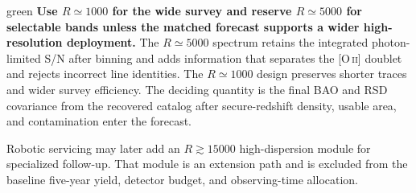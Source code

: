 \begin{leadbox}[title=Cosmology Selection Rule]{green}
\textbf{Use $R\simeq1000$ for the wide survey and reserve $R\simeq5000$ for selectable bands unless the matched forecast supports a wider high-resolution deployment.}
The $R\simeq5000$ spectrum retains the integrated photon-limited S/N after binning and adds information that separates the [O\,\textsc{ii}] doublet and rejects incorrect line identities. The $R\simeq1000$ design preserves shorter traces and wider survey efficiency. The deciding quantity is the final BAO and RSD covariance from the recovered catalog after secure-redshift density, usable area, and contamination enter the forecast.
\end{leadbox}

Robotic servicing may later add an $R\gtrsim15000$ high-dispersion module for
specialized follow-up. That module is an extension path and is excluded from
the baseline five-year yield, detector budget, and observing-time allocation.

